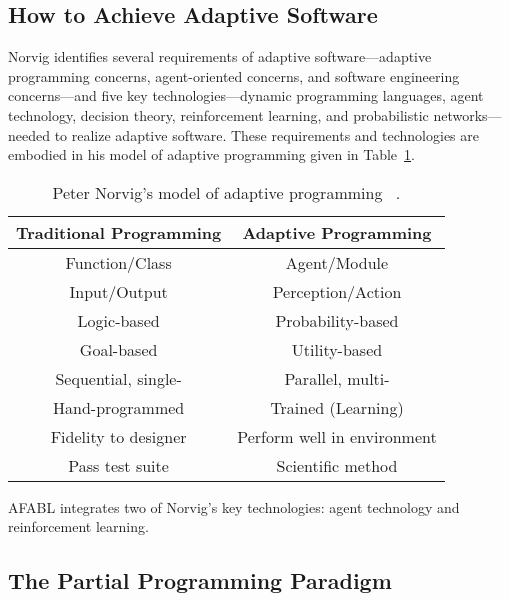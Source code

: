 \subsection{How to Achieve Adaptive Software}

Norvig identifies several requirements of adaptive soft\-ware---adaptive programming concerns, agent-oriented concerns, and software engineering concerns---and five key technologies---dynamic programming languages, agent technology, decision theory, reinforcement learning, and probabilistic networks---needed to realize adaptive software.  These requirements and technologies are embodied in his model of adaptive programming given in Table~\ref{tab:adaptive-model}.

\begin{table}[h]
\begin{tabular}{|c|c|}\hline
Traditional Programming & Adaptive Programming \\ \hline
Function/Class & Agent/Module \\
Input/Output & Perception/Action \\
Logic-based & Probability-based \\
Goal-based & Utility-based \\
Sequential, single- & Parallel, multi- \\
Hand-programmed & Trained (Learning) \\
Fidelity to designer & Perform well in environment \\
Pass test suite & Scientific method\\ \hline
\end{tabular}
\caption{Peter Norvig's model of adaptive programming
  ~\cite{norvig1998decision}.}
\label{tab:adaptive-model}
\end{table}

AFABL integrates two of Norvig's key technologies: agent technology and reinforcement learning.


\subsection{The Partial Programming Paradigm}

